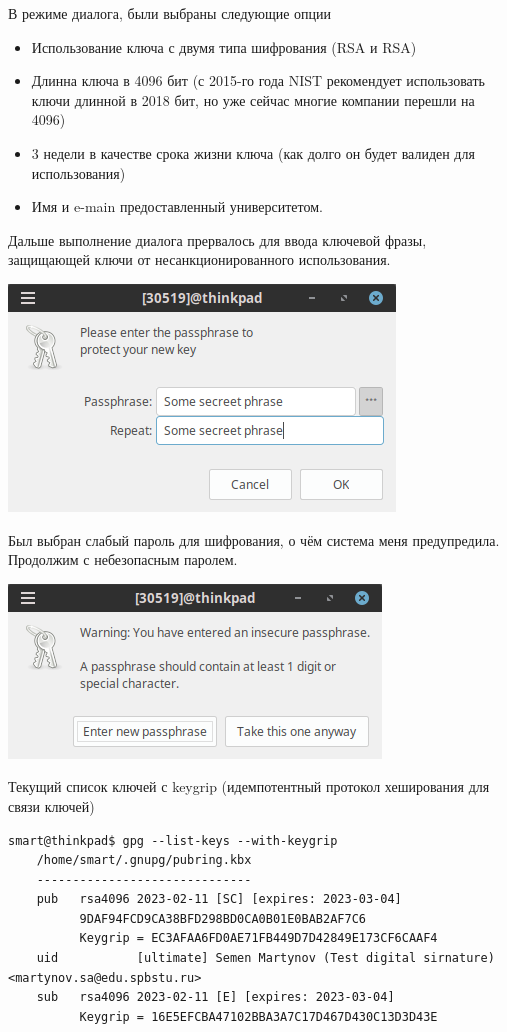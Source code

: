 В режиме диалога, были выбраны следующие опции
\begin{itemize}
    \item Использование ключа с двумя типа шифрования (RSA и RSA)
    \item Длинна ключа в 4096 бит (с 2015-го года NIST рекомендует использовать ключи длинной в 2018 бит, но уже сейчас многие компании перешли на 4096)
    \item 3 недели в качестве срока жизни ключа (как долго он будет валиден для использования)
    \item Имя и e-main предоставленный университетом.
\end{itemize}

Дальше выполнение диалога прервалось для ввода ключевой фразы, защищающей ключи от несанкционированного использования.
\begin{center}
\includegraphics[scale=0.8]{res/3.pass1.png}
\end{center}

Был выбран слабый пароль для шифрования, о чём система меня предупредила. Продолжим с небезопасным паролем.
\begin{center}
\includegraphics[scale=0.8]{res/3.pass2.png}
\end{center}

Текущий список ключей с keygrip (идемпотентный протокол хеширования для связи ключей)
\begin{Verbatim}[frame=single]
    smart@thinkpad$ gpg --list-keys --with-keygrip
    /home/smart/.gnupg/pubring.kbx
    ------------------------------
    pub   rsa4096 2023-02-11 [SC] [expires: 2023-03-04]
          9DAF94FCD9CA38BFD298BD0CA0B01E0BAB2AF7C6
          Keygrip = EC3AFAA6FD0AE71FB449D7D42849E173CF6CAAF4
    uid           [ultimate] Semen Martynov (Test digital sirnature) <martynov.sa@edu.spbstu.ru>
    sub   rsa4096 2023-02-11 [E] [expires: 2023-03-04]
          Keygrip = 16E5EFCBA47102BBA3A7C17D467D430C13D3D43E
\end{Verbatim}

